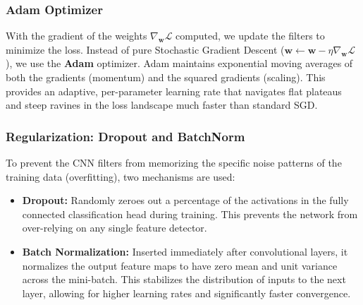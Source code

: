 \subsubsection{Adam Optimizer}
With the gradient of the weights $\nabla_\mathbf{w} \mathcal{L}$ computed, we update the filters to minimize the loss. Instead of pure Stochastic Gradient Descent ($\mathbf{w} \leftarrow \mathbf{w} - \eta \nabla_\mathbf{w} \mathcal{L}$), we use the \textbf{Adam} optimizer. Adam maintains exponential moving averages of both the gradients (momentum) and the squared gradients (scaling). This provides an adaptive, per-parameter learning rate that navigates flat plateaus and steep ravines in the loss landscape much faster than standard SGD.

\subsubsection{Regularization: Dropout and BatchNorm}
To prevent the CNN filters from memorizing the specific noise patterns of the training data (overfitting), two mechanisms are used:
\begin{itemize}
    \item \textbf{Dropout:} Randomly zeroes out a percentage of the activations in the fully connected classification head during training. This prevents the network from over-relying on any single feature detector.
    \item \textbf{Batch Normalization:} Inserted immediately after convolutional layers, it normalizes the output feature maps to have zero mean and unit variance across the mini-batch. This stabilizes the distribution of inputs to the next layer, allowing for higher learning rates and significantly faster convergence.
\end{itemize}

\newpage
